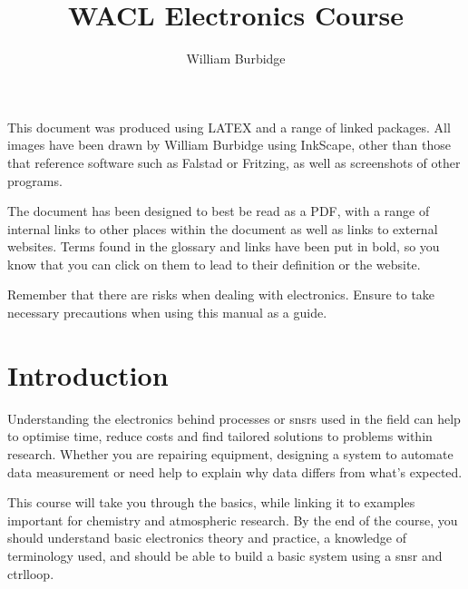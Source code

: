 \documentclass[a4paper,11pt]{report}
\title{WACL Electronics Course}
\author{William Burbidge}
\begin{document}
\maketitle

\tableofcontents

\vspace*{3\baselineskip}

This document was produced using LATEX and a range of linked packages. All images have been drawn by William Burbidge using InkScape, other than those that reference software such as Falstad or Fritzing, as well as screenshots of other programs.

\vspace*{2\baselineskip}

The document has been designed to best be read as a PDF, with a range of internal links to other places within the document as well as links to external websites. Terms found in the glossary and links have been put in bold, so you know that you can click on them to lead to their definition or the website.

\vspace*{2\baselineskip}

Remember that there are risks when dealing with electronics. Ensure to take necessary precautions when using this manual as a guide.

\doublespacing

\pagebreak

\section{Introduction}

Understanding the electronics behind processes or \gls{snsr}s used in the field can help to optimise time, reduce costs and find tailored solutions to problems within research. Whether you are repairing equipment, designing a system to automate data measurement or need help to explain why data differs from what's expected.

This course will take you through the basics, while linking it to examples important for chemistry and atmospheric research. By the end of the course, you should understand basic electronics theory and practice, a knowledge of terminology used, and should be able to build a basic system using a \gls{snsr} and \gls{ctrlloop}.
\end{document}
